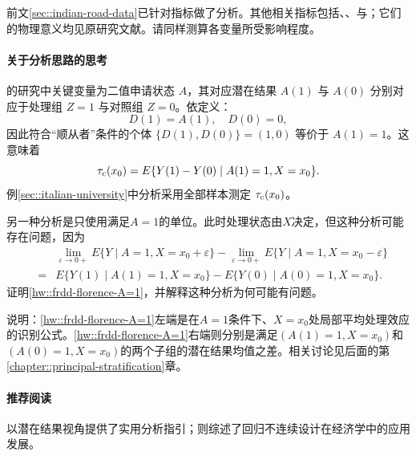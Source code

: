 前文\ref{sec::indian-road-data}已针对指标做了分析。其他相关指标包括、、与；它们的物理意义均见原研究文献。请同样测算各变量所受影响程度。 

 

\paragraph{关于\citet{li2015evaluating}分析思路的思考}
\label{problem::italy-srd}

\citet{li2015evaluating}的研究中关键变量为二值申请状态 $A$，其对应潜在结果 $A(1)$ 与 $A(0)$ 分别对应于处理组 $Z=1$ 与对照组 $Z=0$。依定义：
$$
D(1) = A(1), \quad D(0) = 0,
$$
因此符合“顺从者”条件的个体 $\{ D(1), D(0) \} = (1,0)$ 等价于 $A(1) = 1$。这意味着
$$
\tau_{\textup{c}}(x_0) = E\{ Y(1) - Y(0) \mid A(1) = 1, X = x_0 \}. 
$$
例\ref{sec::italian-university}中分析采用全部样本测定 $\tau_{\textup{c}}(x_0)$。 

另一种分析是只使用满足$A=1$的单位。此时处理状态由$X$决定，但这种分析可能存在问题，因为\begin{eqnarray}
&& \lim_{\varepsilon \rightarrow 0+} E\{ Y \mid A  = 1, X = x_0 + \varepsilon \} -\lim_{\varepsilon \rightarrow 0+}  E\{ Y \mid A  = 1, X = x_0- \varepsilon  \}  \nonumber  \\
&=& E\{ Y(1) \mid A(1)  = 1,   X = x_0   \} -  E\{ Y(0) \mid A(0)  = 1,   X = x_0   \} .\label{hw::frdd-florence-A=1}
\end{eqnarray}证明\eqref{hw::frdd-florence-A=1}，并解释这种分析为何可能有问题。


说明：\eqref{hw::frdd-florence-A=1}左端是在$A=1$条件下、$X=x_0$处局部平均处理效应的识别公式。\eqref{hw::frdd-florence-A=1}右端则分别是满足$(A(1)  = 1,   X = x_0 )$和$(A(0)  = 1,   X = x_0)$的两个子组的潜在结果均值之差。相关讨论见后面的第\ref{chapter::principal-stratification}章。 
 


 
 \paragraph{推荐阅读}

\citet{imbens2008regression}以潜在结果视角提供了实用分析指引；\citet{lee2010regression}则综述了回归不连续设计在经济学中的应用发展。 
